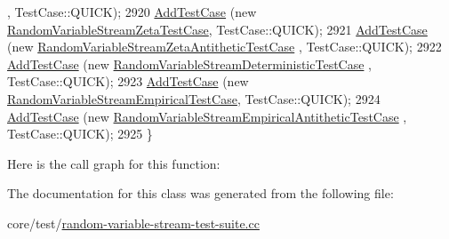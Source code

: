 \begin{DoxyCode}
      , TestCase::QUICK);
2920   \hyperlink{classns3_1_1TestCase_a3718088e3eefd5d6454569d2e0ddd835}{AddTestCase} (\textcolor{keyword}{new} \hyperlink{classRandomVariableStreamZetaTestCase}{RandomVariableStreamZetaTestCase}, 
      TestCase::QUICK);
2921   \hyperlink{classns3_1_1TestCase_a3718088e3eefd5d6454569d2e0ddd835}{AddTestCase} (\textcolor{keyword}{new} \hyperlink{classRandomVariableStreamZetaAntitheticTestCase}{RandomVariableStreamZetaAntitheticTestCase}
      , TestCase::QUICK);
2922   \hyperlink{classns3_1_1TestCase_a3718088e3eefd5d6454569d2e0ddd835}{AddTestCase} (\textcolor{keyword}{new} \hyperlink{classRandomVariableStreamDeterministicTestCase}{RandomVariableStreamDeterministicTestCase}
      , TestCase::QUICK);
2923   \hyperlink{classns3_1_1TestCase_a3718088e3eefd5d6454569d2e0ddd835}{AddTestCase} (\textcolor{keyword}{new} \hyperlink{classRandomVariableStreamEmpiricalTestCase}{RandomVariableStreamEmpiricalTestCase}, 
      TestCase::QUICK);
2924   \hyperlink{classns3_1_1TestCase_a3718088e3eefd5d6454569d2e0ddd835}{AddTestCase} (\textcolor{keyword}{new} \hyperlink{classRandomVariableStreamEmpiricalAntitheticTestCase}{RandomVariableStreamEmpiricalAntitheticTestCase}
      , TestCase::QUICK);
2925 \}
\end{DoxyCode}


Here is the call graph for this function\+:




The documentation for this class was generated from the following file\+:\begin{DoxyCompactItemize}
\item 
core/test/\hyperlink{random-variable-stream-test-suite_8cc}{random-\/variable-\/stream-\/test-\/suite.\+cc}\end{DoxyCompactItemize}

